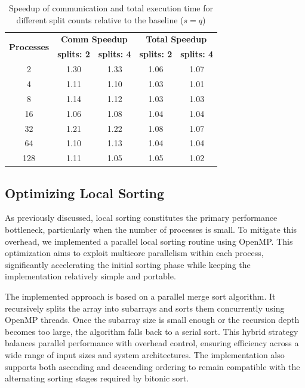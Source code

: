\documentclass{article}
\begin{document}
\begin{table}[h]
\centering
\begin{tabular}{|c|c|c|c|c|}
\hline
\multirow{2}{*}{\textbf{Processes}} & \multicolumn{2}{c|}{\textbf{Comm Speedup}} & 
\multicolumn{2}{c|}{\textbf{Total Speedup}} \\
\cline{2-5}
 & \textbf{splits: 2} & \textbf{splits: 4} & \textbf{splits: 2} & \textbf{splits: 4} \\
\hline
2   & 1.30 & 1.33 & 1.06 & 1.07 \\
4   & 1.11 & 1.10 & 1.03 & 1.01 \\
8   & 1.14 & 1.12 & 1.03 & 1.03 \\
16  & 1.06 & 1.08 & 1.04 & 1.04 \\
32  & 1.21 & 1.22 & 1.08 & 1.07 \\
64  & 1.10 & 1.13 & 1.04 & 1.04 \\
128 & 1.11 & 1.05 & 1.05 & 1.02 \\
\hline
\end{tabular}
\caption{Speedup of communication and total execution time for different split counts relative to the baseline 
($s = q$)}
\label{tab:speedups_by_splits}
\end{table}

\subsection{Optimizing Local Sorting}

As previously discussed, local sorting constitutes the primary performance bottleneck, particularly when the 
number of processes is small. To mitigate this overhead, we implemented a parallel local sorting routine using 
OpenMP. This optimization aims to exploit multicore parallelism within each process, significantly accelerating 
the initial sorting phase while keeping the implementation relatively simple and portable.

The implemented approach is based on a parallel merge sort algorithm. It recursively splits the array into 
subarrays and sorts them concurrently using OpenMP threads. Once the subarray size is small enough or the 
recursion depth becomes too large, the algorithm falls back to a serial sort. This hybrid strategy balances 
parallel performance with overhead control, ensuring efficiency across a wide range of input sizes and system 
architectures. The implementation also supports both ascending and descending ordering to remain compatible 
with the alternating sorting stages required by bitonic sort.
\end{document}
